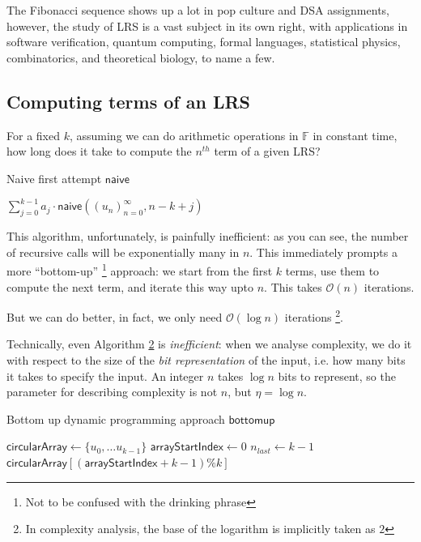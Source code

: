 \documentclass[10.8pt,oneside,reqno]{article}
\begin{document}
The Fibonacci sequence shows up a lot in pop culture and DSA assignments, however, the study
of LRS is a vast subject in its own right, with applications in software verification, quantum
computing, formal languages, statistical physics, combinatorics, and theoretical biology, to name
a few.

\subsection{Computing terms of an LRS}

For a fixed $k$, assuming we can do arithmetic operations in $\mathbb{F}$ in constant time, how long does it
take to compute the $n^{th}$ term of a given LRS?  

\begin{algorithm}
    \caption{Naive first attempt $\mathsf{naive}$}
    \SetAlgoLined
    \DontPrintSemicolon
    \Return $\sum_{j=0}^{k-1} a_j \cdot \mathsf{naive}(( u_n )_{n=0} ^{\infty},n-k+j)$ \;

\end{algorithm}

This algorithm, unfortunately, is painfully inefficient: as you can see, the number of recursive calls will be exponentially many in $n$. This immediately prompts a more “bottom-up” \footnote{Not to be confused with the drinking phrase} approach: we start from the first $k$ terms, use them to compute the next term, and iterate this way upto $n$. This takes $\mathcal{O}(n)$ iterations. 

But we can do better, in fact, we only need $\mathcal{O}( \log n)$ iterations \footnote{In complexity analysis, the base of the logarithm is implicitly taken as $2$}. 

Technically, even Algorithm \hyperref[algo:2]{2} is \textit{inefficient}: when we analyse complexity, we do it with respect to
the size of the \textit{bit representation} of the input, i.e. how many bits it takes to specify the input. An
integer $n$ takes $ \log n$ bits to represent, so the parameter for describing complexity is not $n$, but
$\eta = \log n$. 

\begin{algorithm}
    \label{algo:2}
    \caption{Bottom up dynamic programming approach $\mathsf{bottomup}$}
    
    \SetAlgoLined
    \DontPrintSemicolon
    $\mathsf{circularArray} \gets \{u_0 ,\dots u_{k-1}\}$\;
    $\mathsf{arrayStartIndex} \gets 0$\;
    $ n_{last} \gets k-1 $\;
    \Return $\mathsf{circularArray}[(\mathsf{arrayStartIndex}+k-1) \% k]$\;

\end{algorithm}
\end{document}

